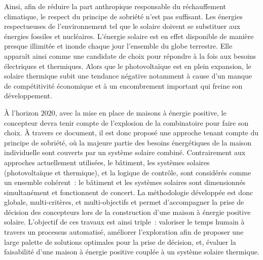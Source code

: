 Ainsi, afin de réduire la part anthropique responsable du réchauffement climatique, le
respect du principe de sobriété n’est pas suffisant. Les énergies respectueuses de
l’environnement tel que le solaire doivent se substituer aux énergies fossiles et
nucléaires. L’énergie solaire est en effet disponible de manière presque illimitée et
inonde chaque jour l’ensemble du globe terrestre. Elle apparaît ainsi comme une candidate
de choix pour répondre à la fois aux besoins électriques et thermiques. Alors que le
photovoltaïque est en plein expansion, le solaire thermique subit une tendance négative
notamment à cause d’un manque de compétitivité économique et à un encombrement important
qui freine son développement.

À l’horizon $2020$, avec la mise en place de maisons à énergie positive, le concepteur devra
tenir compte de l’explosion de la combinatoire pour faire son choix. À travers ce document, il est donc proposé une approche
tenant compte du principe de sobriété, où la majeure partie des besoins énergétiques de la
maison individuelle sont couverts par un système solaire combiné. Contrairement aux
approches actuellement utilisées, le bâtiment, les systèmes solaires (photovoltaïque et
thermique), et la logique de contrôle, sont considérés comme un ensemble cohérent~: le
bâtiment et les systèmes solaires sont dimensionnés simultanément et fonctionnent de
concert. La méthodologie développée est donc globale, multi-critères, et multi-objectifs
et permet d’accompagner la prise de décision des concepteurs lors de la construction d’une
maison à énergie positive solaire. L’objectif de ces travaux est ainsi triple~: valoriser
le temps humain à travers un processus automatisé, améliorer l’exploration afin de
proposer une large palette de solutions optimales pour la prise de décision, et, évaluer
la faisabilité d’une maison à énergie positive couplée à un système solaire thermique.


